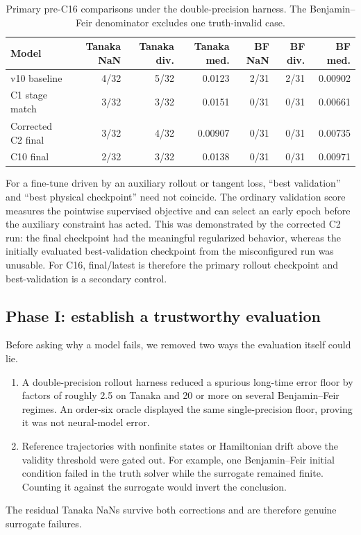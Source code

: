 \documentclass[11pt]{article}
\begin{document}
\begin{table}[ht]
\centering
\small
\begin{tabular}{lrrrrrr}
\toprule
Model & Tanaka NaN & Tanaka div. & Tanaka med. & BF NaN & BF div. & BF med. \\
\midrule
v10 baseline & 4/32 & 5/32 & 0.0123 & 2/31 & 2/31 & 0.00902 \\
C1 stage match & 3/32 & 3/32 & 0.0151 & 0/31 & 0/31 & 0.00661 \\
Corrected C2 final & 3/32 & 4/32 & 0.00907 & 0/31 & 0/31 & 0.00735 \\
C10 final & 2/32 & 3/32 & 0.0138 & 0/31 & 0/31 & 0.00971 \\
\bottomrule
\end{tabular}
\caption{Primary pre-C16 comparisons under the double-precision harness.  The
Benjamin--Feir denominator excludes one truth-invalid case.}
\label{tab:checkpoint-baselines}
\end{table}

For a fine-tune driven by an auxiliary rollout or tangent loss, ``best
validation'' and ``best physical checkpoint'' need not coincide.  The ordinary
validation score measures the pointwise supervised objective and can select an
early epoch before the auxiliary constraint has acted.  This was demonstrated
by the corrected C2 run: the final checkpoint had the meaningful regularized
behavior, whereas the initially evaluated best-validation checkpoint from the
misconfigured run was unusable.  For C16, final/latest is therefore the primary
rollout checkpoint and best-validation is a secondary control.

\subsection{Phase I: establish a trustworthy evaluation}

Before asking why a model fails, we removed two ways the evaluation itself
could lie.
\begin{enumerate}
  \item A double-precision rollout harness reduced a spurious long-time error
        floor by factors of roughly 2.5 on Tanaka and 20 or more on several
        Benjamin--Feir regimes.  An order-six oracle displayed the same
        single-precision floor, proving it was not neural-model error.
  \item Reference trajectories with nonfinite states or Hamiltonian drift
        above the validity threshold were gated out.  For example, one
        Benjamin--Feir initial condition failed in the truth solver while the
        surrogate remained finite.  Counting it against the surrogate would
        invert the conclusion.
\end{enumerate}
The residual Tanaka NaNs survive both corrections and are therefore genuine
surrogate failures.
\end{document}
